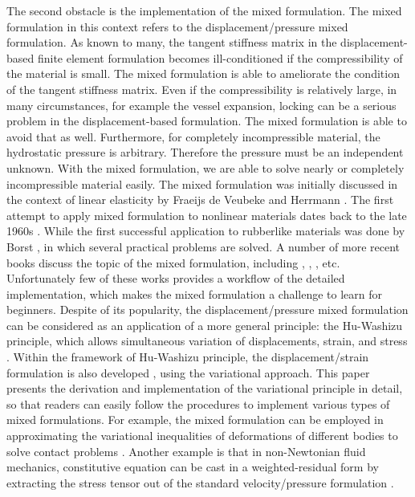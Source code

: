 The second obstacle is the implementation of the mixed formulation. The mixed formulation in this context  refers to the displacement/pressure mixed formulation. As known to many, the tangent stiffness matrix in the displacement-based finite element formulation becomes ill-conditioned if the compressibility of the material is small. The mixed formulation is able to ameliorate the condition of the tangent stiffness matrix. Even if the compressibility is relatively large, in many circumstances, for example the vessel expansion, locking can be a serious problem in the displacement-based formulation. The mixed formulation is able to avoid that as well. Furthermore, for completely incompressible material, the hydrostatic pressure is arbitrary. Therefore the pressure must be an independent unknown. With the mixed formulation, we are able to solve nearly or completely incompressible material easily. 
The mixed formulation was initially discussed in the context of linear elasticity by Fraeijs de Veubeke \cite{Veubeke} and Herrmann \cite{Herrmann}. The first attempt to apply mixed formulation to nonlinear materials dates back to the late 1960s \cite{Oden}. While the first successful application to rubberlike materials was done by Borst \cite{Borst}, in which several practical problems are solved. A number of more recent books discuss the topic of the mixed formulation, including \cite{Bathe}, \cite{Holzapfel}, \cite{Zienkiewicz}, etc. Unfortunately few of these works provides a workflow of the detailed implementation, which makes the mixed formulation a challenge to learn for beginners. Despite of its popularity, the displacement/pressure mixed formulation can be considered as an application of a more general principle: the Hu-Washizu principle, which allows simultaneous variation of displacements, strain, and stress \cite{Hu}. Within the framework of Hu-Washizu principle, the displacement/strain formulation is also developed \cite{Cervera, Rifai}, using the variational approach. This paper presents the derivation and implementation of the variational principle in detail, so that readers can easily follow the procedures to implement various types of mixed formulations. For example, the mixed formulation can be employed in approximating the variational inequalities of deformations of different bodies to solve contact problems \cite{Taylor}. Another example is that in non-Newtonian fluid mechanics, constitutive equation can be cast in a weighted-residual form by extracting the stress tensor out of the standard velocity/pressure formulation \cite{Baaijens}. 

